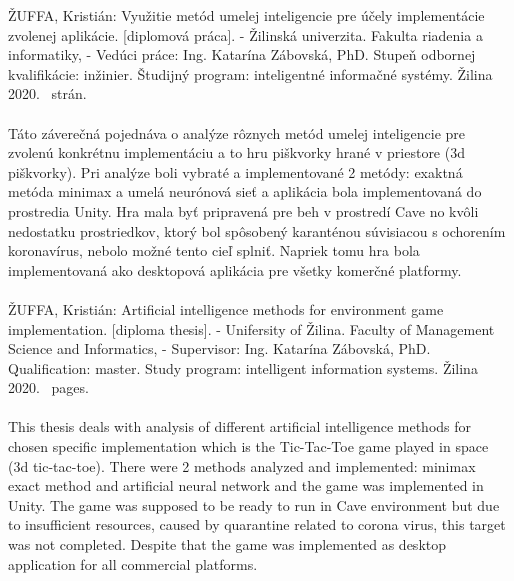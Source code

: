 ŽUFFA, Kristián: Využitie metód umelej inteligencie pre účely implementácie zvolenej aplikácie.
[diplomová práca].
- Žilinská univerzita.
Fakulta riadenia a informatiky, -
Vedúci práce: Ing. Katarína Zábovská, PhD.
Stupeň odbornej kvalifikácie: inžinier.
Študijný program: inteligentné informačné systémy.
Žilina 2020.~\pageref{LastPage} strán.
\\
\\
Táto záverečná pojednáva o analýze rôznych metód umelej inteligencie pre zvolenú konkrétnu implementáciu a to hru
piškvorky hrané v priestore (3d piškvorky).
Pri analýze boli vybraté a implementované 2 metódy: exaktná metóda minimax a umelá neurónová sieť a aplikácia bola
implementovaná do prostredia Unity.
Hra mala byť pripravená pre beh v prostredí Cave no kvôli nedostatku prostriedkov, ktorý bol spôsobený karanténou
súvisiacou s ochorením koronavírus, nebolo možné tento cieľ splniť.
Napriek tomu hra bola implementovaná ako desktopová aplikácia pre všetky komerčné platformy.
\\
\\

ŽUFFA, Kristián: Artificial intelligence methods for environment game implementation.
[diploma thesis].
- Unifersity of Žilina.
Faculty of Management Science and Informatics, -
Supervisor: Ing. Katarína Zábovská, PhD.
Qualification: master.
Study program: intelligent information systems.
Žilina 2020.~\pageref{LastPage} pages.
\\
\\
This thesis deals with analysis of different artificial intelligence methods for chosen specific implementation which
is the Tic-Tac-Toe game played in space (3d tic-tac-toe).
There were 2 methods analyzed and implemented: minimax exact method and artificial neural network and the game was
implemented in Unity.
The game was supposed to be ready to run in Cave environment but due to insufficient resources, caused by quarantine
related to corona virus, this target was not completed.
Despite that the game was implemented as desktop application for all commercial platforms.
\\

